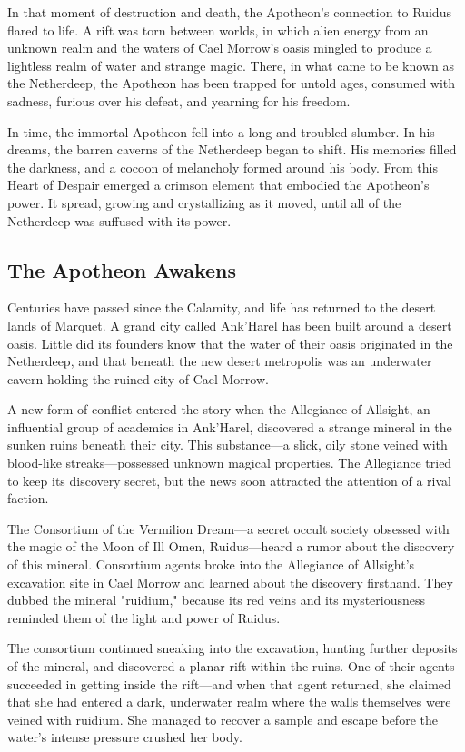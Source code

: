 \documentclass[10pt,a4paper,twoside,twocolumn,openany,nodeprecatedcode]{dndbook}
\begin{document}
In that moment of destruction and death, the Apotheon's connection to Ruidus flared to life. A rift was torn between worlds, in which alien energy from an unknown realm and the waters of Cael Morrow's oasis mingled to produce a lightless realm of water and strange magic. There, in what came to be known as the Netherdeep, the Apotheon has been trapped for untold ages, consumed with sadness, furious over his defeat, and yearning for his freedom.

In time, the immortal Apotheon fell into a long and troubled slumber. In his dreams, the barren caverns of the Netherdeep began to shift. His memories filled the darkness, and a cocoon of melancholy formed around his body. From this Heart of Despair emerged a crimson element that embodied the Apotheon's power. It spread, growing and crystallizing as it moved, until all of the Netherdeep was suffused with its power.

\subsection{The Apotheon Awakens}
Centuries have passed since the Calamity, and life has returned to the desert lands of Marquet. A grand city called Ank'Harel has been built around a desert oasis. Little did its founders know that the water of their oasis originated in the Netherdeep, and that beneath the new desert metropolis was an underwater cavern holding the ruined city of Cael Morrow.

A new form of conflict entered the story when the Allegiance of Allsight, an influential group of academics in Ank'Harel, discovered a strange mineral in the sunken ruins beneath their city. This substance—a slick, oily stone veined with blood-like streaks—possessed unknown magical properties. The Allegiance tried to keep its discovery secret, but the news soon attracted the attention of a rival faction.

The Consortium of the Vermilion Dream—a secret occult society obsessed with the magic of the Moon of Ill Omen, Ruidus—heard a rumor about the discovery of this mineral. Consortium agents broke into the Allegiance of Allsight's excavation site in Cael Morrow and learned about the discovery firsthand. They dubbed the mineral "ruidium," because its red veins and its mysteriousness reminded them of the light and power of Ruidus.

The consortium continued sneaking into the excavation, hunting further deposits of the mineral, and discovered a planar rift within the ruins. One of their agents succeeded in getting inside the rift—and when that agent returned, she claimed that she had entered a dark, underwater realm where the walls themselves were veined with ruidium. She managed to recover a sample and escape before the water's intense pressure crushed her body.
\end{document}
